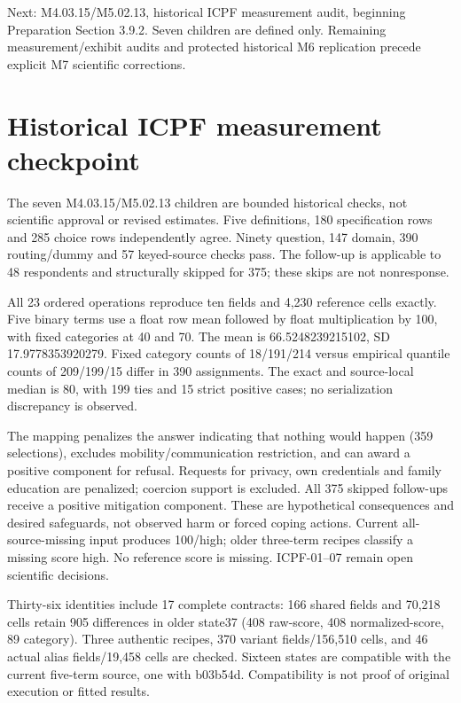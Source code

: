 \documentclass[11pt,a4paper]{article}
\begin{document}
Next: M4.03.15/M5.02.13, historical ICPF measurement audit, beginning
Preparation Section 3.9.2. Seven children are defined only. Remaining
measurement/exhibit audits and protected historical M6 replication
precede explicit M7 scientific corrections.

\section{Historical ICPF measurement checkpoint}
The seven M4.03.15/M5.02.13 children are bounded historical checks,
not scientific approval or revised estimates. Five definitions,
180 specification rows and 285 choice rows independently agree.
Ninety question, 147 domain, 390 routing/dummy and 57 keyed-source
checks pass. The follow-up is applicable to 48 respondents and
structurally skipped for 375; these skips are not nonresponse.

All 23 ordered operations reproduce ten fields and 4,230 reference
cells exactly. Five binary terms use a float row mean followed by
float multiplication by 100, with fixed categories at 40 and 70.
The mean is 66.5248239215102, SD 17.9778353920279.
Fixed category counts of 18/191/214 versus empirical quantile counts
of 209/199/15 differ in 390 assignments.
The exact and source-local median is 80, with 199 ties and
15 strict positive cases; no serialization discrepancy is observed.

The mapping penalizes the answer indicating that nothing would happen
(359 selections), excludes mobility/communication restriction, and
can award a positive component for refusal. Requests for privacy,
own credentials and family education are penalized; coercion support
is excluded. All 375 skipped follow-ups receive a positive mitigation
component. These are hypothetical consequences and desired safeguards,
not observed harm or forced coping actions.
Current all-source-missing input produces 100/high; older three-term
recipes classify a missing score high. No reference score is missing.
ICPF-01--07 remain open scientific decisions.

Thirty-six identities include 17 complete contracts:
166 shared fields and 70,218 cells retain 905 differences in older
state37 (408 raw-score, 408 normalized-score, 89 category).
Three authentic recipes, 370 variant fields/156,510 cells, and
46 actual alias fields/19,458 cells are checked.
Sixteen states are compatible with the current five-term source,
one with b03b54d. Compatibility is not proof of original execution
or fitted results.
\end{document}
